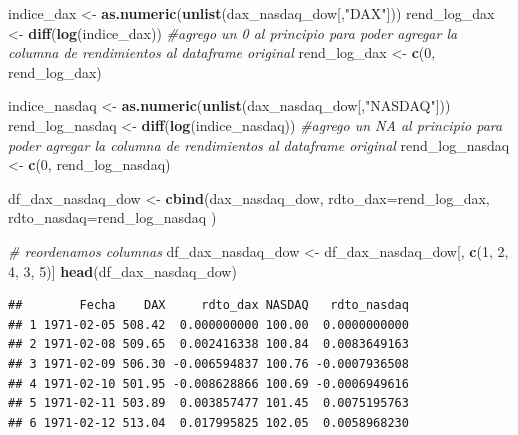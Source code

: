 \documentclass[
  11pt,
]{article}
\newenvironment{Shaded}{\begin{snugshade}}{\end{snugshade}}
\newcommand{\CommentTok}[1]{\textcolor[rgb]{0.56,0.35,0.01}{\textit{#1}}}
\newcommand{\DataTypeTok}[1]{\textcolor[rgb]{0.13,0.29,0.53}{#1}}
\newcommand{\DecValTok}[1]{\textcolor[rgb]{0.00,0.00,0.81}{#1}}
\newcommand{\KeywordTok}[1]{\textcolor[rgb]{0.13,0.29,0.53}{\textbf{#1}}}
\newcommand{\NormalTok}[1]{#1}
\newcommand{\StringTok}[1]{\textcolor[rgb]{0.31,0.60,0.02}{#1}}
\begin{document}
\begin{Shaded}
\begin{Highlighting}[]
\NormalTok{indice_dax <-}\StringTok{ }\KeywordTok{as.numeric}\NormalTok{(}\KeywordTok{unlist}\NormalTok{(dax_nasdaq_dow[,}\StringTok{"DAX"}\NormalTok{]))}
\NormalTok{rend_log_dax <-}\StringTok{ }\KeywordTok{diff}\NormalTok{(}\KeywordTok{log}\NormalTok{(indice_dax))}
\CommentTok{#agrego un 0 al principio para poder agregar la columna de rendimientos al dataframe original }
\NormalTok{rend_log_dax <-}\StringTok{ }\KeywordTok{c}\NormalTok{(}\DecValTok{0}\NormalTok{, rend_log_dax)}

\NormalTok{indice_nasdaq <-}\StringTok{ }\KeywordTok{as.numeric}\NormalTok{(}\KeywordTok{unlist}\NormalTok{(dax_nasdaq_dow[,}\StringTok{"NASDAQ"}\NormalTok{]))}
\NormalTok{rend_log_nasdaq <-}\StringTok{ }\KeywordTok{diff}\NormalTok{(}\KeywordTok{log}\NormalTok{(indice_nasdaq))}
\CommentTok{#agrego un NA al principio para poder agregar la columna de rendimientos al dataframe original }
\NormalTok{rend_log_nasdaq <-}\StringTok{ }\KeywordTok{c}\NormalTok{(}\DecValTok{0}\NormalTok{, rend_log_nasdaq)}
\end{Highlighting}
\end{Shaded}

\begin{Shaded}
\begin{Highlighting}[]
\NormalTok{df_dax_nasdaq_dow <-}\StringTok{ }\KeywordTok{cbind}\NormalTok{(dax_nasdaq_dow,}
                           \DataTypeTok{rdto_dax=}\NormalTok{rend_log_dax, }
                           \DataTypeTok{rdto_nasdaq=}\NormalTok{rend_log_nasdaq}
\NormalTok{                           )}

\CommentTok{# reordenamos columnas}
\NormalTok{df_dax_nasdaq_dow <-}\StringTok{ }\NormalTok{df_dax_nasdaq_dow[, }\KeywordTok{c}\NormalTok{(}\DecValTok{1}\NormalTok{, }\DecValTok{2}\NormalTok{, }\DecValTok{4}\NormalTok{, }\DecValTok{3}\NormalTok{, }\DecValTok{5}\NormalTok{)]}
\KeywordTok{head}\NormalTok{(df_dax_nasdaq_dow)}
\end{Highlighting}
\end{Shaded}

\begin{verbatim}
##        Fecha    DAX     rdto_dax NASDAQ   rdto_nasdaq
## 1 1971-02-05 508.42  0.000000000 100.00  0.0000000000
## 2 1971-02-08 509.65  0.002416338 100.84  0.0083649163
## 3 1971-02-09 506.30 -0.006594837 100.76 -0.0007936508
## 4 1971-02-10 501.95 -0.008628866 100.69 -0.0006949616
## 5 1971-02-11 503.89  0.003857477 101.45  0.0075195763
## 6 1971-02-12 513.04  0.017995825 102.05  0.0058968230
\end{verbatim}
\end{document}
